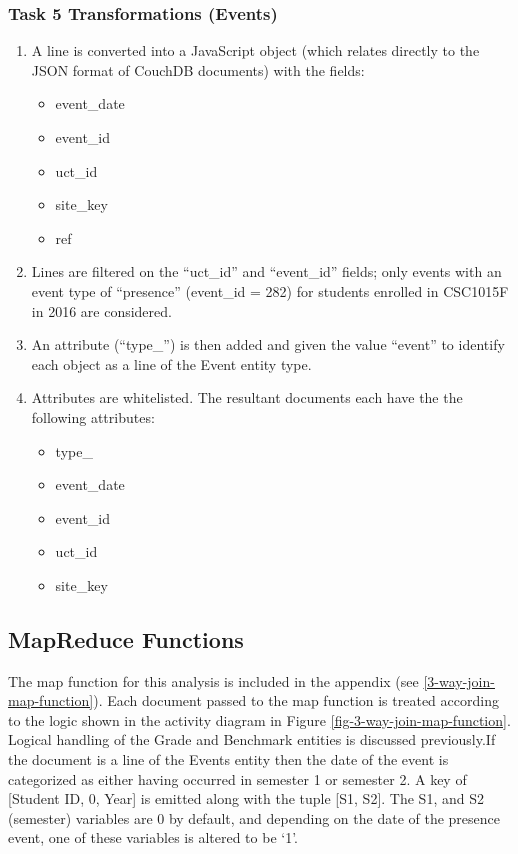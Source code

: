 \subsubsection{Task 5 Transformations (Events)}
\begin{enumerate}
  \item A line is converted into a JavaScript object (which relates directly to the JSON format of CouchDB documents) with the fields:
        \begin{itemize}
          \item event\_date
          \item event\_id
          \item uct\_id
          \item site\_key
          \item ref
        \end{itemize}
  \item Lines are filtered on the ``uct\_id'' and ``event\_id'' fields; only events with an event type of ``presence'' (event\_id = 282) for students enrolled in CSC1015F in 2016 are considered.
  \item An attribute (``type\_'') is then added and given the value ``event'' to identify each object as a line of the Event entity type.
  \item Attributes are whitelisted. The resultant documents each have the the following attributes:
        \begin{itemize}
          \item type\_
          \item event\_date
          \item event\_id
          \item uct\_id
          \item site\_key
        \end{itemize}
\end{enumerate}

\subsection{MapReduce Functions}
The map function for this analysis is included in the appendix (see \ref{3-way-join-map-function}). Each document passed to the map function is treated according to the logic shown in the activity diagram in Figure \ref{fig-3-way-join-map-function}. Logical handling of the Grade and Benchmark entities is discussed previously.If the document is a line of the Events entity then the date of the event is categorized as either having occurred in semester 1 or semester 2. A key of [Student ID, 0, Year] is emitted along with the tuple [S1, S2]. The S1, and S2 (semester) variables are 0 by default, and depending on the date of the presence event, one of these variables is altered to be `1'.

